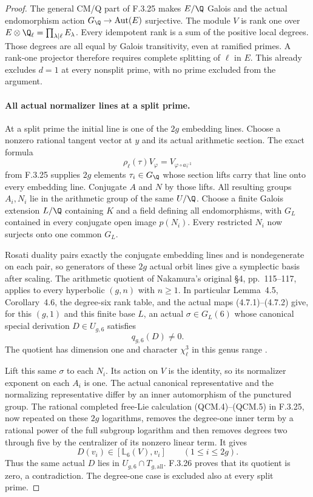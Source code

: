 \begin{proof}
The general CM/Q part of F.3.25 makes $E/\Q$
Galois and the actual endomorphism action
$G_{\Q}\to\operatorname{Aut}(E)$ surjective.
The module $V$ is rank one over
$E\otimes\Q_\ell=\prod_{\lambda\mid\ell}E_\lambda$.
Every idempotent rank is a sum of the positive
local degrees. Those degrees are all equal by
Galois transitivity, even at ramified primes.
A rank-one projector therefore requires complete
splitting of $\ell$ in $E$. This already excludes
$d=1$ at every nonsplit prime, with no prime
excluded from the argument.

\paragraph{All actual normalizer lines at a split prime.}
At a split prime the initial line is one of
the $2g$ embedding lines. Choose a nonzero
rational tangent vector at $y$ and its actual
arithmetic section. The exact formula
\[
 \rho_\ell(\tau)V_\varphi
          =V_{\varphi\circ a_\tau^{-1}}
\]
from F.3.25 supplies $2g$ elements $\tau_i\in G_{\Q}$
whose section lifts carry that line onto every
embedding line. Conjugate $A$ and $N$ by those
lifts. All resulting groups $A_i,N_i$ lie in
the arithmetic group of the same $U/\Q$.
Choose a finite Galois extension $L/\Q$ containing
$K$ and a field defining all endomorphisms, with
$G_L$ contained in every conjugate open image
$p(N_i)$. Every restricted $N_i$ now surjects
onto one common $G_L$.

Rosati duality pairs exactly the conjugate
embedding lines and is nondegenerate on each
pair, so generators of these $2g$ actual orbit
lines give a symplectic basis after scaling.
The arithmetic quotient of Nakamura's original
\S4, pp.~115--117, applies to every hyperbolic
$(g,n)$ with $n\geq1$. In particular Lemma~4.5,
Corollary~4.6, the degree-six rank table, and
the actual maps (4.7.1)--(4.7.2) give, for this
$(g,1)$ and this finite base $L$, an actual
$\sigma\in G_L(6)$ whose canonical special
derivation $D\in U_{g,6}$ satisfies
\[
                            q_{g,6}(D)\ne0.
\]
The quotient has dimension one and character
$\chi_\ell^3$ in this genus range
\cite[pp.~115--117]{AuditNakamura1996}.

Lift this same $\sigma$ to each $N_i$.
Its action on $V$ is the identity, so its
normalizer exponent on each $A_i$ is one.
The actual canonical representative and the
normalizing representative differ by an inner
automorphism of the punctured group. The rational
completed free-Lie calculation (QCM.4)--(QCM.5)
in F.3.25, now repeated on these $2g$ logarithms,
removes the degree-one inner term by a rational
power of the full subgroup logarithm and then
removes degrees two through five by the
centralizer of its nonzero linear term. It gives
\[
                         D(v_i)\in[\mathbb L_6(V),v_i]
                         \qquad(1\leq i\leq2g).
\]
Thus the same actual $D$ lies in
$U_{g,6}\cap T_{g,\mathrm{all}}$. F.3.26 proves
that its quotient is zero, a contradiction.
The degree-one case is excluded also at every
split prime.


\end{proof}
